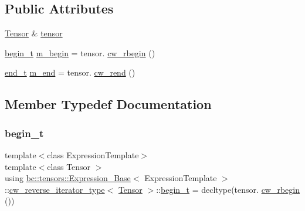 \subsection*{Public Attributes}
\begin{DoxyCompactItemize}
\item 
\hyperlink{namespacebc_a659391e47ab612be3ba6c18cf9c89159}{Tensor} \& \hyperlink{structbc_1_1tensors_1_1Expression__Base_1_1cw__reverse__iterator__type_a2fc2eb2b5fe257af76392b1843d6fafe}{tensor}
\item 
\hyperlink{structbc_1_1tensors_1_1Expression__Base_1_1cw__reverse__iterator__type_a63231d68ab487d4d24996e7a538fc427}{begin\+\_\+t} \hyperlink{structbc_1_1tensors_1_1Expression__Base_1_1cw__reverse__iterator__type_a61ec19c79a2a769ff46a8d43d57a8ff9}{m\+\_\+begin} = tensor. \hyperlink{classbc_1_1tensors_1_1Expression__Base_a82c194b3f8c9e934caf0ac5e5380042a}{cw\+\_\+rbegin} ()
\item 
\hyperlink{structbc_1_1tensors_1_1Expression__Base_1_1cw__reverse__iterator__type_aff1a4ff5ef38cc11c629243ef23d6155}{end\+\_\+t} \hyperlink{structbc_1_1tensors_1_1Expression__Base_1_1cw__reverse__iterator__type_a2bae8ccab838df6ec27e701f9e28e0be}{m\+\_\+end} = tensor. \hyperlink{classbc_1_1tensors_1_1Expression__Base_acd8f45445f2245cf879680274cc89d7f}{cw\+\_\+rend} ()
\end{DoxyCompactItemize}


\subsection{Member Typedef Documentation}
\mbox{\label{structbc_1_1tensors_1_1Expression__Base_1_1cw__reverse__iterator__type_a63231d68ab487d4d24996e7a538fc427}} 
\subsubsection{\texorpdfstring{begin\+\_\+t}{begin\_t}}
{\footnotesize\ttfamily template$<$class Expression\+Template$>$ \\
template$<$class Tensor $>$ \\
using \hyperlink{classbc_1_1tensors_1_1Expression__Base}{bc\+::tensors\+::\+Expression\+\_\+\+Base}$<$ Expression\+Template $>$\+::\hyperlink{structbc_1_1tensors_1_1Expression__Base_1_1cw__reverse__iterator__type}{cw\+\_\+reverse\+\_\+iterator\+\_\+type}$<$ \hyperlink{namespacebc_a659391e47ab612be3ba6c18cf9c89159}{Tensor} $>$\+::\hyperlink{structbc_1_1tensors_1_1Expression__Base_1_1cw__reverse__iterator__type_a63231d68ab487d4d24996e7a538fc427}{begin\+\_\+t} =  decltype(tensor. \hyperlink{classbc_1_1tensors_1_1Expression__Base_a82c194b3f8c9e934caf0ac5e5380042a}{cw\+\_\+rbegin} ())}

